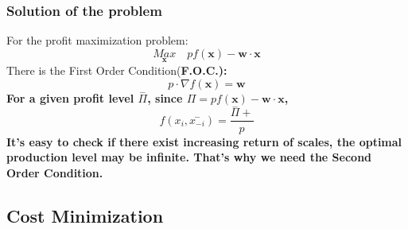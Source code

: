 \documentclass{article}
\theoremstyle{plain}
\theoremstyle{definition}
\theoremstyle{remark}
\begin{document}
\subsubsection{Solution of the problem}
For the profit maximization problem:
\begin{equation}
	\underset{\bm{x}}{Max}\quad p f(\bm{x}) - \bm{w}\cdot\bm{x}
\end{equation}
There is the First Order Condition(\bf{F.O.C.}):
\begin{equation}
	p \cdot \nabla f(\bm{x})  = \bm{w}
\end{equation}
For a given profit level $\overset{-}{\Pi}$, since $\Pi = p f(\bm{x}) - \bm{w} \cdot \bm{x}$, 
\begin{equation}
	f(x_i,\overset{-}{x_{-i}}) = \frac{\overset{-}{\Pi}+}{p}
\end{equation} 
It's easy to check if there exist increasing return of scales, the optimal production level may be infinite. That's why we need the Second Order Condition. 
\subsection{Cost Minimization}
\end{document}
